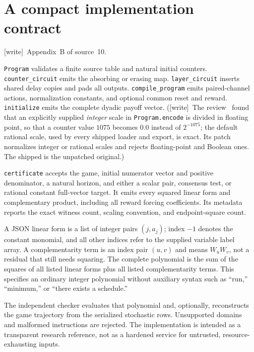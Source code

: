 \documentclass[11pt,letterpaper]{article}
\theoremstyle{definition}
\theoremstyle{remark}
\newcommand{\wtag}{\textup{[write]}}
\begin{document}
\section{A compact implementation contract}\label{ste:ec:app:contract}

\noindent\wtag\ Appendix~B of source~10.


\texttt{Program} validates a finite source table and natural initial
counters. \texttt{counter\_circuit} emits the absorbing or erasing map.
\texttt{layer\_circuit} inserts shared delay copies and pads all outputs.
\texttt{compile\_program} emits paired-channel actions, normalization
constants, and optional common reset and reward. \texttt{initialize}
emits the complete dyadic payoff vector.
(\wtag\ The review~\cite{review808} found that an explicitly supplied \emph{integer} scale in \texttt{Program.encode} is divided in floating point, so that a counter value $1075$ becomes $0.0$ instead of $2^{-1075}$; the default rational scale, used by every shipped loader and export, is exact. Its patch  normalizes integer or rational scales and rejects floating-point and Boolean ones. The shipped  is the unpatched original.)

\texttt{certificate} accepts the game, initial numerator vector and positive
denominator, a natural horizon, and either a scalar pair, consensus test,
or rational constant full-vector target. It emits every squared linear
form and complementary product, including all reward forcing coefficients.
Its metadata reports the exact witness count, scaling convention, and
endpoint-square count.

A JSON linear form is a list of integer pairs $(j,a_j)$; index $-1$ denotes
the constant monomial, and all other indices refer to the supplied variable
label array. A complementarity term is an index pair $(u,v)$ and means
$W_uW_v$, not a residual that still needs squaring. The complete polynomial
is the sum of the squares of all listed linear forms plus all listed
complementarity terms. This specifies an ordinary integer polynomial
without auxiliary syntax such as ``run,'' ``minimum,'' or ``there exists
a schedule.''

The independent checker evaluates that polynomial and, optionally,
reconstructs the game trajectory from the serialized stochastic rows.
Unsupported domains and malformed instructions are rejected. The implementation
is intended as a transparent research reference, not as a hardened service
for untrusted, resource-exhausting inputs.
\end{document}

